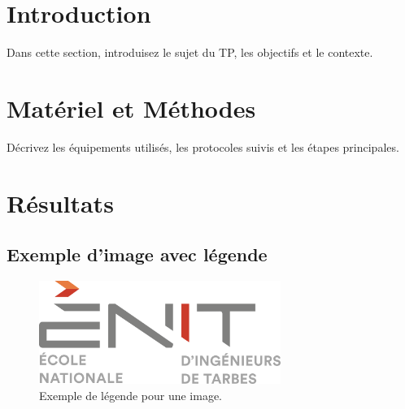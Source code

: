 \documentclass[a4paper,12pt]{article}
\begin{document}
\pagestyle{fancy}
\fancyhf{} %
\fancyfoot[R]{\thepage} %
\renewcommand{\headrulewidth}{0.4pt} %

\tableofcontents
\newpage

\section{Introduction}
Dans cette section, introduisez le sujet du TP, les objectifs et le contexte.

\section{Matériel et Méthodes}
Décrivez les équipements utilisés, les protocoles suivis et les étapes principales.

\section{Résultats}
\subsection{Exemple d'image avec légende}
\begin{figure}[h!]
	\centering
	\includegraphics[width=0.7\textwidth]{media/logo-enit-2454399073.png} %
	\caption{Exemple de légende pour une image.}
	\label{fig:exemple_image}
\end{figure}
\end{document}
